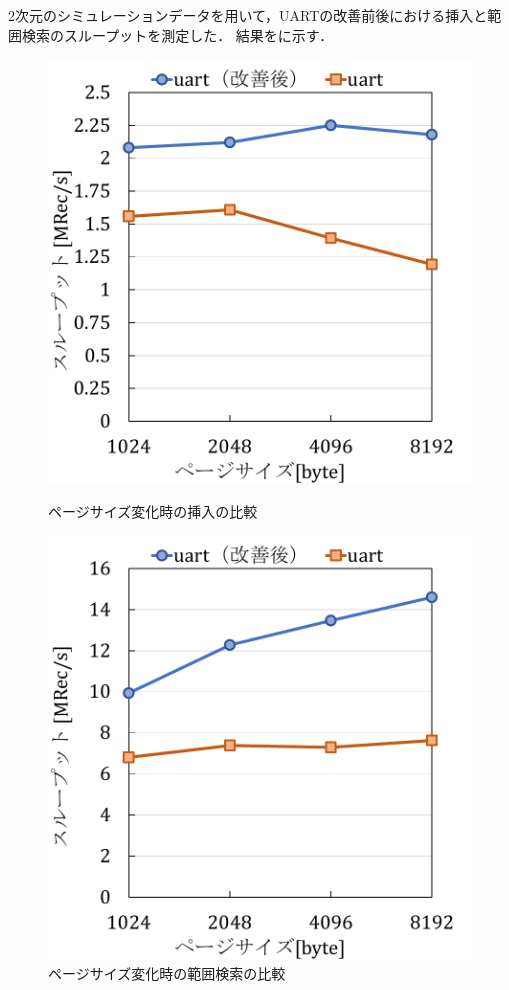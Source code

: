 2次元のシミュレーションデータを用いて，UARTの改善前後における挿入と範囲検索のスループットを測定した．
結果を\Fig{\ref{graph:ps-in}}\Fig{\ref{graph:ps-sc}}に示す．
\begin{figure}[tb]
  \begin{minipage}[c]{0.495\textwidth}
    \centering
    \includegraphics[scale=0.5]{./figures/graph-pagesize-insert.pdf}
    \caption{ページサイズ変化時の挿入の比較}
    \label{graph:ps-in}
  \end{minipage}
  \begin{minipage}[c]{0.495\textwidth}
    \centering
    \includegraphics[scale=0.5]{./figures/graph-pagesize-scan.pdf}
    \caption{ページサイズ変化時の範囲検索の比較}
    \label{graph:ps-sc}
  \end{minipage}
\end{figure}
